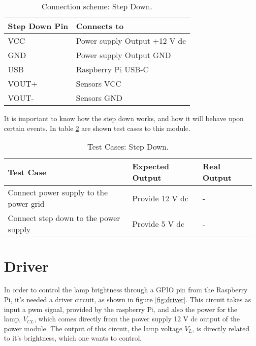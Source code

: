 \begin{table}[H]
	\centering
	\begin{tabular}{|m{5cm}|m{6cm}|}
		\hline
		\textbf{Step Down Pin} & \textbf{Connects to}
		\\\hline\hline
		
		VCC & Power supply Output +12 V \ac{dc}
		\\\hline
		GND & Power supply Output GND
		\\\hline
		USB & Raspberry Pi USB-C
		\\\hline
		VOUT+ & Sensors VCC
		\\\hline
		VOUT- & Sensors GND
		\\\hline
	\end{tabular}
	
	\caption{Connection scheme: Step Down.}
	\label{table:connect_power}
\end{table}

It is important to know how the step down works, and how it will behave upon certain events. In table \ref{table:test_step_down} are shown test cases to this module.

\begin{table}[H]
	\centering
	\resizebox{\columnwidth}{!}
	{
		\begin{tabular}{|m{3cm}|m{5cm}||m{5cm}|}
			\hline
			\textbf{Test Case} & \textbf{Expected Output} & \textbf{Real Output}
			\\\hline\hline
			Connect power supply to the power grid & Provide 12 V \ac{dc} & -
			\\\hline
			Connect step down to the power supply & Provide 5 V \ac{dc} & -
			\\\hline
		\end{tabular}
	}
	\caption{Test Cases: Step Down.}
	\label{table:test_step_down}
\end{table}
\section{Driver}
\label{subsection:driver}
In order to control the lamp brightness through a GPIO pin from the Raspberry Pi, it's needed a driver circuit, as shown in figure \ref{fig:driver}. This circuit takes as input a \ac{pwm} signal, provided by the raspberry Pi, and also the power for the lamp, \(V_{CL}\), which comes directly from the power supply 12 V \ac{dc} output of the power module. The output of this circuit, the lamp voltage \(V_{L}\), is directly related to it's brightness, which one wants to control.

